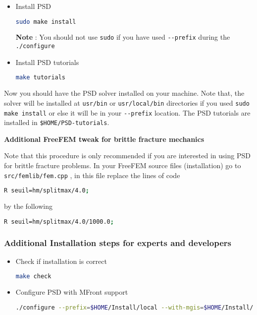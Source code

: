 \begin{itemize}
\begin{lstlisting}[language=bash]
make
\end{lstlisting}
\item
  Install PSD

\begin{lstlisting}[language=bash]
sudo make install
\end{lstlisting}

  \textbf{Note} : You should not use \lstinline!sudo! if you have used
  \lstinline!--prefix! during the \lstinline!./configure!
\item
  Install PSD tutorials

\begin{lstlisting}[language=bash]
make tutorials
\end{lstlisting}
\end{itemize}

Now you should have the PSD solver installed on your machine. Note that,
the solver will be installed at \lstinline!usr/bin! or
\lstinline!usr/local/bin! directories if you used
\lstinline!sudo make install! or else it will be in your
\lstinline!--prefix! location. The PSD tutorials are installed in
\lstinline!$HOME/PSD-tutorials!.

\textbf{Additional FreeFEM tweak for brittle fracture mechanics}

Note that this procedure is only recommended if you are interested in
using PSD for brittle fracture problems. In your FreeFEM source files
(installation) go to \lstinline!src/femlib/fem.cpp! , in this file
replace the lines of code

\begin{lstlisting}[language=bash]
R seuil=hm/splitmax/4.0;
\end{lstlisting}

by the following

\begin{lstlisting}[language=bash]
R seuil=hm/splitmax/4.0/1000.0;
\end{lstlisting}

\subsubsection{Additional Installation steps for experts and
developers}\label{additional-installation-steps-for-experts-and-developers}

\begin{itemize}
\item
  Check if installation is correct

\begin{lstlisting}[language=bash]
make check
\end{lstlisting}
\item
  Configure PSD with MFront support

\begin{lstlisting}[language=bash]
./configure --prefix=$HOME/Install/local --with-mgis=$HOME/Install/local/mgis --with-mfront=$HOME/Install/local/mfront/bin/mfront  --with-FreeFEM=$HOME/Install/local/FreeFem/bin  --with-Gmsh=$HOME/Install/local/Gmsh/bin
\end{lstlisting}
\end{itemize}

